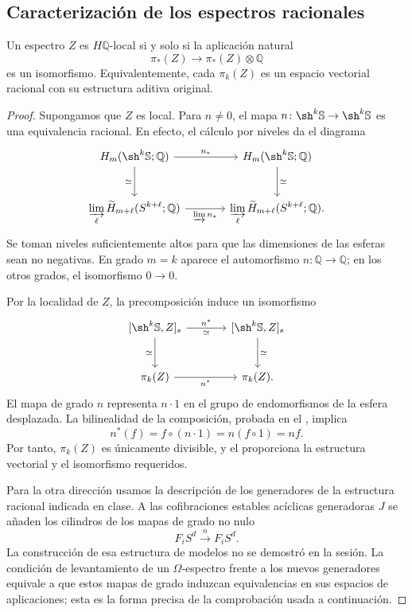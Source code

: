 \subsection{Caracterización de los espectros racionales}
\begin{lema}\label{lema:c22-local-racional}
Un espectro $Z$ es $H\mathbb Q$-local si y solo si la aplicación natural
\[
\pi_*(Z)\longrightarrow\pi_*(Z)\otimes\mathbb Q
\]
es un isomorfismo. Equivalentemente, cada $\pi_k(Z)$ es un espacio vectorial racional con su estructura aditiva original.
\end{lema}
\begin{proof}
Supongamos que $Z$ es local. Para $n\ne0$, el mapa $n\colon\sh^k\mathbb S\to\sh^k\mathbb S$ es una equivalencia racional. En efecto, el cálculo por niveles da el diagrama
\[
\begin{tikzcd}[column sep=large,row sep=large]
H_m(\sh^k\mathbb S;\mathbb Q)\arrow[r,"n_*"]\arrow[d,"\simeq"']
&H_m(\sh^k\mathbb S;\mathbb Q)\arrow[d,"\simeq"]\\
\displaystyle\varinjlim_\ell\widetilde H_{m+\ell}(S^{k+\ell};\mathbb Q)
\arrow[r,"\varinjlim n_*"']
&\displaystyle\varinjlim_\ell\widetilde H_{m+\ell}(S^{k+\ell};\mathbb Q).
\end{tikzcd}
\]
Se toman niveles suficientemente altos para que las dimensiones de las esferas sean no negativas. En grado $m=k$ aparece el automorfismo $n\colon\mathbb Q\to\mathbb Q$; en los otros grados, el isomorfismo $0\to0$.

Por la localidad de $Z$, la precomposición induce un isomorfismo
\[
\begin{tikzcd}[column sep=large,row sep=large]
{[\sh^k\mathbb S,Z]_s}\arrow[r,"n^*","\simeq"']\arrow[d,"\simeq"']
&{[\sh^k\mathbb S,Z]_s}\arrow[d,"\simeq"]\\
\pi_k(Z)\arrow[r,"n^*"']&\pi_k(Z).
\end{tikzcd}
\]
El mapa de grado $n$ representa $n\cdot1$ en el grupo de endomorfismos de la esfera desplazada. La bilinealidad de la composición, probada en el , implica
\[
n^*(f)=f\circ(n\cdot1)=n(f\circ1)=nf.
\]
Por tanto, $\pi_k(Z)$ es únicamente divisible, y el  proporciona la estructura vectorial y el isomorfismo requeridos.

Para la otra dirección usamos la descripción de los generadores de la estructura racional indicada en clase. A las cofibraciones estables acíclicas generadoras $J$ se añaden los cilindros de los mapas de grado no nulo
\[
F_iS^d\xrightarrow{\ n\ }F_iS^d.
\]
La construcción de esa estructura de modelos no se demostró en la sesión. La condición de levantamiento de un $\Omega$-espectro frente a los nuevos generadores equivale a que estos mapas de grado induzcan equivalencias en sus espacios de aplicaciones; esta es la forma precisa de la comprobación usada a continuación.


\end{proof}
